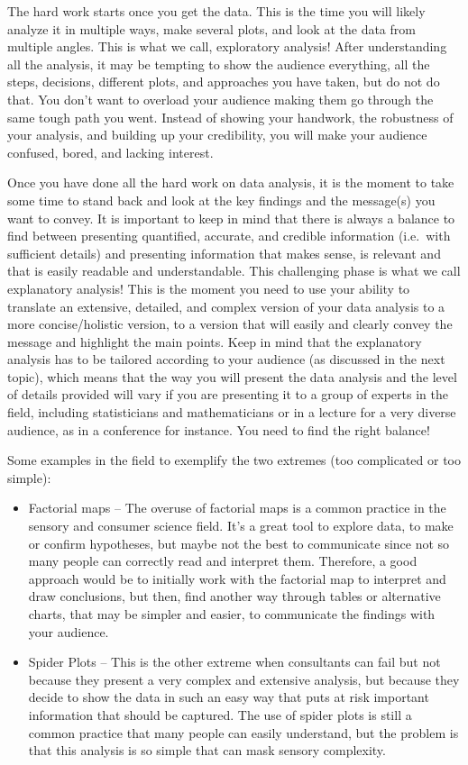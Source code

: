 \documentclass[
]{book}
\begin{document}
The hard work starts once you get the data. This is the time you will likely analyze it in multiple ways, make several plots, and look at the data from multiple angles. This is what we call, exploratory analysis! After understanding all the analysis, it may be tempting to show the audience everything, all the steps, decisions, different plots, and approaches you have taken, but do not do that. You don't want to overload your audience making them go through the same tough path you went. Instead of showing your handwork, the robustness of your analysis, and building up your credibility, you will make your audience confused, bored, and lacking interest.

Once you have done all the hard work on data analysis, it is the moment to take some time to stand back and look at the key findings and the message(s) you want to convey. It is important to keep in mind that there is always a balance to find between presenting quantified, accurate, and credible information (i.e.~with sufficient details) and presenting information that makes sense, is relevant and that is easily readable and understandable. This challenging phase is what we call explanatory analysis! This is the moment you need to use your ability to translate an extensive, detailed, and complex version of your data analysis to a more concise/holistic version, to a version that will easily and clearly convey the message and highlight the main points. Keep in mind that the explanatory analysis has to be tailored according to your audience (as discussed in the next topic), which means that the way you will present the data analysis and the level of details provided will vary if you are presenting it to a group of experts in the field, including statisticians and mathematicians or in a lecture for a very diverse audience, as in a conference for instance. You need to find the right balance!

Some examples in the field to exemplify the two extremes (too complicated or too simple):

\begin{itemize}
\item
  Factorial maps -- The overuse of factorial maps is a common practice in the sensory and consumer science field. It's a great tool to explore data, to make or confirm hypotheses, but maybe not the best to communicate since not so many people can correctly read and interpret them. Therefore, a good approach would be to initially work with the factorial map to interpret and draw conclusions, but then, find another way through tables or alternative charts, that may be simpler and easier, to communicate the findings with your audience.
\item
  Spider Plots -- This is the other extreme when consultants can fail but not because they present a very complex and extensive analysis, but because they decide to show the data in such an easy way that puts at risk important information that should be captured. The use of spider plots is still a common practice that many people can easily understand, but the problem is that this analysis is so simple that can mask sensory complexity.
\end{itemize}
\end{document}
